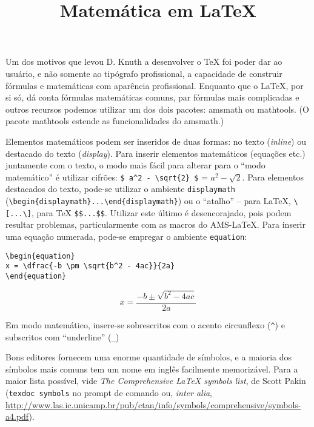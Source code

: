 \documentclass{scrartcl}
\begin{document}
\title{Matemática em {\selectfont\LaTeX}}
\maketitle
\date{}

Um dos motivos que levou D. Knuth a desenvolver o \TeX{} foi poder dar ao usuário, e não somente ao tipógrafo profissional, a capacidade de construir fórmulas e matemáticas com aparência profissional. Enquanto que  o \LaTeX, por si só, dá conta fórmulas matemáticas comuns, par fórmulas mais complicadas e outros recursos podemos utilizar um dos dois pacotes: \textsf{amsmath} ou \textsf{mathtools}. (O pacote \textsf{mathtools} estende as funcionalidades do \textsf{amsmath}.)

Elementos matemáticos podem ser inseridos de duas formas: no texto (\textit{inline}) ou destacado do texto (\textit{display}). Para inserir elementos matemáticos (equações etc.) juntamente com o texto, o modo mais fácil para alterar para o ``modo matemático'' é utilizar cifrões: \verb+$ a^2 - \sqrt{2} $+ = $ a^2 - \sqrt{2} $. Para elementos destacados do texto, pode-se utilizar o ambiente \texttt{displaymath} (\verb+\begin{displaymath}...\end{displaymath}+) ou o ``atalho'' -- para \LaTeX{}, \verb+\[...\]+, para \TeX{} \verb+$$...$$+. Utilizar este último é desencorajado, pois podem resultar problemas, particularmente com as macros do AMS-\LaTeX. Para inserir uma equação numerada, pode-se empregar o ambiente \texttt{equation}:

\begin{verbatim}
\begin{equation}
x = \dfrac{-b \pm \sqrt{b^2 - 4ac}}{2a}
\end{equation}
\end{verbatim}


\begin{equation}
x = \dfrac{-b \pm \sqrt{b^2 - 4ac}}{2a}
\end{equation}


Em modo matemático, insere-se sobrescritos com o acento circunflexo (\verb+^+) e subscritos com ``underline'' (\verb+_+)

Bons editores fornecem uma enorme quantidade de símbolos, e a maioria dos símbolos mais comuns tem um nome em inglês facilmente memorizável. Para a maior lista possível, vide \textit{The Comprehensive \LaTeX{} symbols list}, de Scott Pakin (\verb+texdoc symbols+ no prompt de comando ou, \textit{inter alia}, \url{http://www.las.ic.unicamp.br/pub/ctan/info/symbols/comprehensive/symbols-a4.pdf}). 
\end{document}
